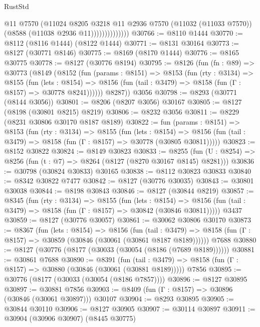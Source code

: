 \begin{lexlean}{RustStd}
\begin{coremodule}
                          @11
                          @7570
                          (@11024
                            @8205
                            @3218
                            @11
                            @2936
                            @7570
                            (@11032 (@11033 @7570))
                            (@8588 (@11038 @2936 @11))))))))))))))
@30766 := @8110 @1444
@30770 := @8112 (@8116 @1444) (@8122 @1444)
@30771 := @8131 @30164
@30773 := @8127 (@30771 @8146)
@30775 := @8169 (@8170 @1444)
@30776 := @8165 @30775
@30778 := @8127 (@30776 @8194)
@30795 := @8126
    (fun (fn : @89) =>
    @30773
      (@8149
        (@8152
          (fun (params : @8151) =>
          @8153
            (fun (rty : @3134) =>
            @8155
              (fun (lets : @8154) =>
              @8156 (fun (tail : @3479) => @8158 (fun (Γ : @8157) => @30778 @8241))))))
        @8287))
    @3056
@30798 := @8293 (@30771 (@8144 @3056))
@30801 := @8206 (@8207 @3056) @30167
@30805 := @8127 (@8198 (@30801 @8215) @8219)
@30806 := @8232 @3056
@30811 := @8229 (@8231 @30806 @30170 @8187 @8189)
@30822 := fun (params : @8151) =>
  @8153
    (fun (rty : @3134) =>
    @8155
      (fun (lets : @8154) =>
      @8156 (fun (tail : @3479) => @8158 (fun (Γ : @8157) => @30778 (@30805 @30811)))))
@30823 := @8152 @30822
@30824 := @8149 @30823
@30833 := @8255
    (fun (U : @8254) => @8256 (fun (t : @7) => @8264 (@8127 (@8270 @30167 @8145) @8281)))
@30836 := @30798 (@30824 @30833) @30165
@30838 := @8112 @30823 @30833
@30840 := @8342 @30822 @7477
@30842 := @8127 (@30776 @30035)
@30843 := @30801 @30038
@30844 := @8198 @30843
@30846 := @8127 (@30844 @8219)
@30857 := @8345
    (fun (rty : @3134) =>
    @8155
      (fun (lets : @8154) =>
      @8156 (fun (tail : @3479) => @8158 (fun (Γ : @8157) => @30842 (@30846 @30811)))))
    @3437
@30859 := @8127 (@30776 @30057)
@30861 := @30062 @30806 @30170
@30873 := @8367
    (fun (lets : @8154) =>
    @8156
      (fun (tail : @3479) =>
      @8158 (fun (Γ : @8157) => @30859 (@30846 (@30061 (@30861 @8187 @8189))))))
    @7688
@30880 := @8127 (@30776 (@8177 (@30033 (@30054 (@8186 (@7689 @8189))))))
@30881 := @30861 @7688
@30890 := @8391
    (fun (tail : @3479) => @8158 (fun (Γ : @8157) => @30880 (@30846 (@30061 (@30881 @8189)))))
    @7856
@30895 := @30776 (@8177 (@30033 (@30054 (@8186 @7857))))
@30896 := @8127 @30895
@30897 := @30881 @7856
@30903 := @8409 (fun (Γ : @8157) => @30896 (@30846 (@30061 @30897))) @30107
@30904 := @8293 @30895
@30905 := @30844 @30110
@30906 := @8127 @30905
@30907 := @30114 @30897
@30911 := @30904 (@30906 @30907) (@8445 @30775)

\end{coremodule}
\end{lexlean}
